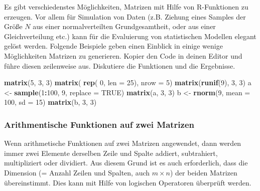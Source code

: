 \documentclass[]{article}
\newenvironment{Shaded}{\begin{snugshade}}{\end{snugshade}}
\newcommand{\KeywordTok}[1]{\textcolor[rgb]{0.13,0.29,0.53}{\textbf{#1}}}
\newcommand{\DataTypeTok}[1]{\textcolor[rgb]{0.13,0.29,0.53}{#1}}
\newcommand{\DecValTok}[1]{\textcolor[rgb]{0.00,0.00,0.81}{#1}}
\newcommand{\StringTok}[1]{\textcolor[rgb]{0.31,0.60,0.02}{#1}}
\newcommand{\OtherTok}[1]{\textcolor[rgb]{0.56,0.35,0.01}{#1}}
\newcommand{\OperatorTok}[1]{\textcolor[rgb]{0.81,0.36,0.00}{\textbf{#1}}}
\newcommand{\NormalTok}[1]{#1}
\begin{document}
Es gibt verschiedenstes Möglichkeiten, Matrizen mit Hilfe von
R-Funktionen zu erzeugen. Vor allem für Simulation von Daten (z.B.
Ziehung eines Samples der Größe \(N\) aus einer normalverteilten
Grundgesamtheit, oder aus einer Gleichverteilung etc.) kann für die
Evaluierung von statistischen Modellen elegant gelöst werden. Folgende
Beispiele geben einen Einblick in einige wenige Möglichkeiten Matrizen
zu generieren. Kopier den Code in deinen Editor und führe diesen
zeilenweise aus. Diskutiere die Funktionen und die Ergebnisse.

\begin{Shaded}
\begin{Highlighting}[]
    \KeywordTok{matrix}\NormalTok{(}\DecValTok{5}\NormalTok{, }\DecValTok{3}\NormalTok{, }\DecValTok{3}\NormalTok{)}
    \KeywordTok{matrix}\NormalTok{( }\KeywordTok{rep}\NormalTok{( }\DecValTok{0}\NormalTok{, }\DataTypeTok{len =} \DecValTok{25}\NormalTok{), }\DataTypeTok{nrow =} \DecValTok{5}\NormalTok{)}
    \KeywordTok{matrix}\NormalTok{(}\KeywordTok{runif}\NormalTok{(}\DecValTok{9}\NormalTok{), }\DecValTok{3}\NormalTok{, }\DecValTok{3}\NormalTok{)}
\NormalTok{    a <-}\StringTok{ }\KeywordTok{sample}\NormalTok{(}\DecValTok{1}\OperatorTok{:}\DecValTok{100}\NormalTok{, }\DecValTok{9}\NormalTok{, }\DataTypeTok{replace =} \OtherTok{TRUE}\NormalTok{)}
    \KeywordTok{matrix}\NormalTok{(a, }\DecValTok{3}\NormalTok{, }\DecValTok{3}\NormalTok{)}
\NormalTok{    b <-}\StringTok{ }\KeywordTok{rnorm}\NormalTok{(}\DecValTok{9}\NormalTok{, }\DataTypeTok{mean =} \DecValTok{100}\NormalTok{, }\DataTypeTok{sd =} \DecValTok{15}\NormalTok{)}
    \KeywordTok{matrix}\NormalTok{(b, }\DecValTok{3}\NormalTok{, }\DecValTok{3}\NormalTok{)}
\end{Highlighting}
\end{Shaded}

\subsubsection*{Arithmentische Funktionen auf zwei
Matrizen}\label{arithmentische-funktionen-auf-zwei-matrizen}

Wenn arithmetische Funktionen auf zwei Matrizen angewendet, dann werden
immer zwei Elemente derselben Zeile und Spalte addiert, subtrahiert,
multipliziert oder dividiert. Aus diesem Grund ist es auch erforderlich,
dass die Dimension (= Anzahl Zeilen und Spalten, auch \(m \times n\))
der beiden Matrizen übereinstimmt. Dies kann mit Hilfe von logischen
Operatoren überprüft werden.
\end{document}
